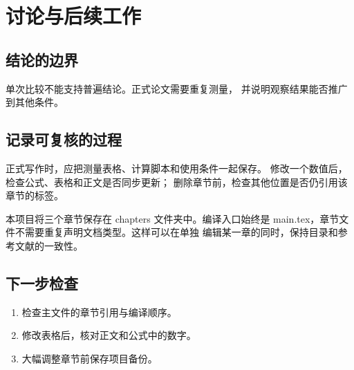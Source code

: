 \section{讨论与后续工作}
\label{sec:discussion}
\subsection{结论的边界}
单次比较不能支持普遍结论。正式论文需要重复测量，
并说明观察结果能否推广到其他条件。
\subsection{记录可复核的过程}
正式写作时，应把测量表格、计算脚本和使用条件一起保存。
修改一个数值后，检查公式、表格和正文是否同步更新；
删除章节前，检查其他位置是否仍引用该章节的标签。

本项目将三个章节保存在 chapters 文件夹中。编译入口始终是
main.tex，章节文件不需要重复声明文档类型。这样可以在单独
编辑某一章的同时，保持目录和参考文献的一致性。
\subsection{下一步检查}
\begin{enumerate}
\item 检查主文件的章节引用与编译顺序。
\item 修改表格后，核对正文和公式中的数字。
\item 大幅调整章节前保存项目备份。
\end{enumerate}
